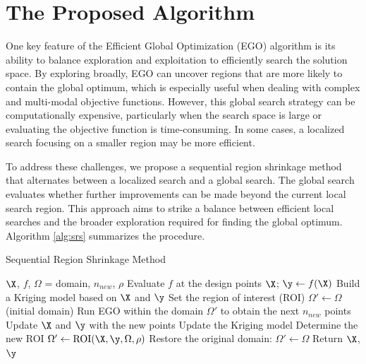 \documentclass [PhD] {package/uclathes}
\begin{document}
\section{The Proposed Algorithm}
One key feature of the Efficient Global Optimization (EGO) algorithm is its ability to balance exploration and exploitation to efficiently search the solution space. By exploring broadly, EGO can uncover regions that are more likely to contain the global optimum, which is especially useful when dealing with complex and multi-modal objective functions. However, this global search strategy can be computationally expensive, particularly when the search space is large or evaluating the objective function is time-consuming. In some cases, a localized search focusing on a smaller region may be more efficient.

To address these challenges, we propose a sequential region shrinkage method that alternates between a localized search and a global search. The global search evaluates whether further improvements can be made beyond the current local search region. This approach aims to strike a balance between efficient local searches and the broader exploration required for finding the global optimum. Algorithm \ref{alg:srs} summarizes the procedure.

\begin{algorithm}%
    \caption{Sequential Region Shrinkage Method}\label{alg:srs}
    \begin{algorithmic}[1]
        \Require $\X$, $f$, $\Omega$ = domain, $n_{new}$, $\rho$
        \State Evaluate $f$ at the design points $\X$; $\y \gets f(\X)$
        \State Build a Kriging model based on $\X$ and $\y$
        \State Set the region of interest (ROI) $\Omega' \gets \Omega$ (initial domain)
            \State Run EGO within the domain $\Omega'$ to obtain the next $n_{new}$ points
            \State Update $\X$ and $\y$ with the new points
            \State Update the Kriging model
            \State Determine the new ROI $\Omega' \gets \text{ROI}(\X, \y, \Omega, \rho)$
                \State Restore the original domain: $\Omega' \gets \Omega$
            \EndIf
        \EndWhile
        \State Return $\X$, $\y$
    \end{algorithmic}
\end{algorithm}
\end{document}
